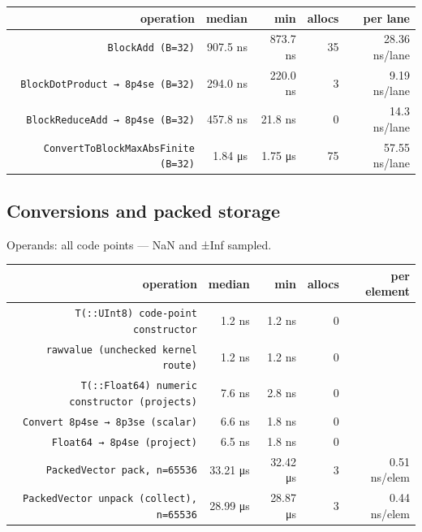 \begin{table}[h]
\centering
\begin{tabulary}{\linewidth}{R R R R R}
\toprule
operation & median & min & allocs & per lane \\
\toprule
\texttt{BlockAdd (B=32)} & 907.5 ns & 873.7 ns & 35 & 28.36 ns/lane \\
\texttt{BlockDotProduct → 8p4se (B=32)} & 294.0 ns & 220.0 ns & 3 & 9.19 ns/lane \\
\texttt{BlockReduceAdd → 8p4se (B=32)} & 457.8 ns & 21.8 ns & 0 & 14.3 ns/lane \\
\texttt{ConvertToBlockMaxAbsFinite (B=32)} & 1.84 μs & 1.75 μs & 75 & 57.55 ns/lane \\
\bottomrule
\end{tabulary}

\end{table}



\subsection{Conversions and packed storage}



\label{4461369721169500046}{}


Operands: all code points — NaN and ±Inf sampled.




\begin{table}[h]
\centering
\begin{tabulary}{\linewidth}{R R R R R}
\toprule
operation & median & min & allocs & per element \\
\toprule
\texttt{T(::UInt8) code-point constructor} & 1.2 ns & 1.2 ns & 0 &  \\
\texttt{rawvalue (unchecked kernel route)} & 1.2 ns & 1.2 ns & 0 &  \\
\texttt{T(::Float64) numeric constructor (projects)} & 7.6 ns & 2.8 ns & 0 &  \\
\texttt{Convert 8p4se → 8p3se (scalar)} & 6.6 ns & 1.8 ns & 0 &  \\
\texttt{Float64 → 8p4se (project)} & 6.5 ns & 1.8 ns & 0 &  \\
\texttt{PackedVector pack, n=65536} & 33.21 μs & 32.42 μs & 3 & 0.51 ns/elem \\
\texttt{PackedVector unpack (collect), n=65536} & 28.99 μs & 28.87 μs & 3 & 0.44 ns/elem \\
\bottomrule
\end{tabulary}

\end{table}



